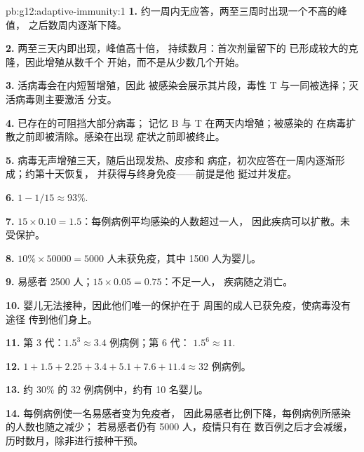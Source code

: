 \begin{solution}{pb:g12:adaptive-immunity:1}
\textbf{1.} 约一周内无应答，两至三周时出现一个不高的峰值，
之后数周内逐渐下降。

\textbf{2.} 两至三天内即出现，峰值高十倍，
持续数月：首次剂量留下的
已形成较大的克隆，因此增殖从数千个
开始，而不是从少数几个开始。

\textbf{3.} 活病毒会在内短暂增殖，因此
被感染会展示其片段，毒性 T 
与一同被选择；灭活病毒则主要激活
分支。

\textbf{4.} 已存在的可阻挡大部分病毒；
记忆 B 与 T 在两天内增殖；被感染的
在病毒扩散之前即被清除。感染在出现
症状之前即被终止。

\textbf{5.} 病毒无声增殖三天，随后出现发热、皮疹和
病症，初次应答在一周内逐渐形成；约第十天恢复，
并获得与终身免疫——前提是他
挺过并发症。

\textbf{6.} $1 - 1/15 \approx 93\%$.

\textbf{7.} $15 \times 0.10 = 1.5$：每例病例平均感染的人数超过一人，
因此疾病可以扩散。未受保护。

\textbf{8.} $10\% \times \num{50000} = 5000$ 人未获免疫，其中
1500 人为婴儿。

\textbf{9.} 易感者 2500 人；$15 \times 0.05 = 0.75$：不足一人，
疾病随之消亡。

\textbf{10.} 婴儿无法接种，因此他们唯一的保护在于
周围的成人已获免疫，使病毒没有途径
传到他们身上。

\textbf{11.} 第 3 代：$1.5^3 \approx 3.4$ 例病例；第 6 代：
$1.5^6 \approx 11$.

\textbf{12.} $1 + 1.5 + 2.25 + 3.4 + 5.1 + 7.6 + 11.4 \approx 32$ 例病例。

\textbf{13.} 约 30\% 的 32 例病例中，约有 10 名婴儿。

\textbf{14.} 每例病例使一名易感者变为免疫者，
因此易感者比例下降，每例病例所感染的人数也随之减少；
若易感者仍有 5000 人，疫情只有在
数百例之后才会减缓，历时数月，除非进行接种干预。


\end{solution}

